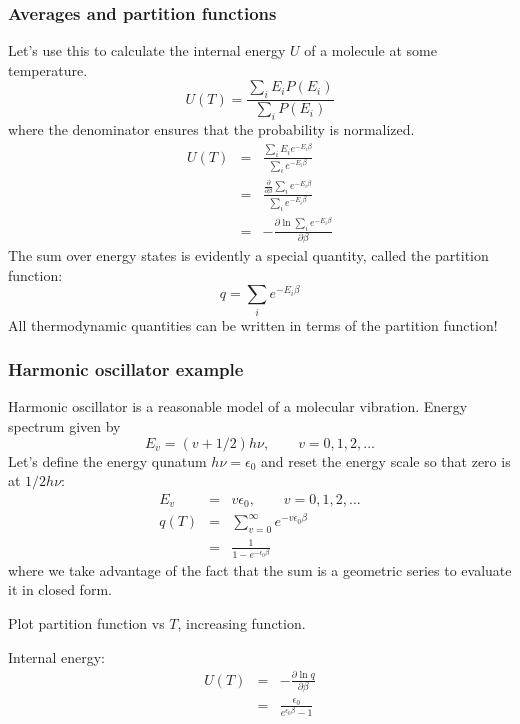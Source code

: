 \documentclass[11pt]{article}
\begin{document}
\subsubsection{Averages and partition functions}
\label{sec:org9c14187}
Let's use this to calculate the internal energy \(U\) of a molecule at some
temperature.
\begin{equation}
  U(T)=\frac{\sum_iE_iP(E_i)}{\sum_iP(E_i)}
\end{equation}
where the denominator ensures that the probability is normalized.
\begin{eqnarray}
  U(T) & =& \frac{\sum_iE_i e^{-E_i\beta}}{\sum_ie^{-E_i\beta}} \\
  & = & \frac{\frac{\partial}{\partial\beta}\sum_ie^{-E_i\beta}}{\sum_ie^{-E_i
      \beta}}\\
& = & -\frac{\partial \ln \sum_i e^{-E_i\beta}}{\partial \beta}
\end{eqnarray}
The sum over energy states is evidently a special quantity, called the
partition function:
\begin{equation}
  q=\sum_ie^{-E_i\beta}
\end{equation}
All thermodynamic quantities can be written in terms of the partition function!

\subsubsection{Harmonic oscillator example}
\label{sec:orgfa52b51}
Harmonic oscillator is a reasonable model of a molecular vibration.  Energy
spectrum given by
\begin{equation}
  E_v=(v+1/2)h\nu,\qquad v=0,1,2,...
\end{equation}
Let's define the energy qunatum \(h\nu=\epsilon_0\) and reset the energy scale so
that zero is at \(1/2 h\nu\):
\begin{eqnarray}
  E_v & = & v\epsilon_0,\qquad v=0,1,2,... \\
q(T) & = &\sum_{v=0}^\infty e^{-v\epsilon_0\beta} \\
 & = & \frac{1}{1-e^{-\epsilon_0\beta}}
\end{eqnarray}
where we take advantage of the fact that the sum is a geometric series to
evaluate it in closed form.

Plot partition function vs \(T\), increasing function.

\noindent Internal energy:
\begin{eqnarray}
  U(T) &=&-\frac{\partial \ln q}{\partial \beta}\\
   & = & \frac{\epsilon_0}{e^{\epsilon_0\beta}-1}
\end{eqnarray}
\end{document}
